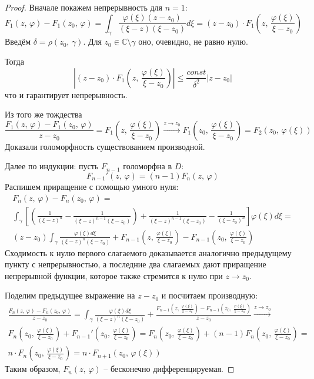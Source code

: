 \documentclass[a4paper,12pt]{article}
\renewcommand{\phi}{\ensuremath{\varphi}}
\renewcommand{\leq}{\ensuremath{\leqslant}}
\theoremstyle{plain}
\theoremstyle{definition}
\theoremstyle{remark}
\begin{document}
\begin{proof}
	Вначале покажем непрерывность для $n = 1$:
	\[
		F_1(z,\, \phi) - F_1(z_0,\, \phi) = \int_\gamma\frac{\phi(\xi)(z - z_0)}{(\xi - z)(\xi - z_0)}d\xi = (z - z_0)\cdot F_1\left(z,\, \frac{\phi(\xi)}{\xi - z_0}\right)
	\]
	Введём $\delta = \rho(z_0,\, \gamma)$. Для $z_0 \in \mathbb{C}\setminus \gamma$ оно, очевидно, не равно нулю.

	Тогда
	\[
		\left\vert (z - z_0)\cdot F_1\left(z,\, \frac{\phi(\xi)}{\xi - z_0}\right)\right\vert \leq \frac{const}{\delta^2}\vert z - z_0\vert
	\]
	что и гарантирует непрерывность.

	Из того же тождества
	\[
		\frac{F_1(z,\, \phi) - F_1(z_0,\, \phi)}{z - z_0} = F_1\left(z,\, \frac{\phi(\xi)}{\xi - z_0}\right) \overset{z \to z_0}{\to} F_1\left(z_0,\, \frac{\phi(\xi)}{\xi - z_0}\right) = F_2(z_0,\, \phi(\xi))
	\]
	Доказали голоморфность существованием производной.

	Далее по индукции: пусть $F_{n - 1}$ голоморфна в $D$:
	\[
		F_{n - 1}'(z,\, \phi) = (n - 1)F_n(z,\, \phi)
	\]
	Распишем приращение с помощью умного нуля:
	\begin{align*}
		F_n(z,\, \phi) - F_n(z_0,\, \phi) =                                                                                                                                                   \\
		\int_\gamma\left[\left(\frac{1}{(\xi - z)^n} - \frac{1}{(\xi - z)^{n - 1}(\xi - z_0)}\right) + \frac{1}{(\xi - z)^{n - 1}(\xi - z_0)} - \frac{1}{(\xi - z_0)^n}\right]\phi(\xi)d\xi = \\
		(z - z_0)\int_\gamma\frac{\phi(\xi)d\xi}{(\xi - z)^n(\xi - z_0)} + F_{n - 1}\left(z,\, \frac{\phi(\xi)}{\xi - z_0}\right) - F_{n-1}\left(z_0,\, \frac{\phi(\xi)}{\xi - z_0}\right)
	\end{align*}
	Сходимость к нулю первого слагаемого доказывается аналогично предыдущему пункту с непрерывностью, а последние два слагаемых дают приращение непрерывной функции, которое также стремится к нулю при $z \to z_0$.

	Поделим предыдущее выражение на $z - z_0$ и посчитаем производную:
	\begin{align*}
		\frac{F_n(z,\, \phi) - F_n(z_0,\, \phi)}{z - z_0} = \int_\gamma\frac{\phi(\xi)d\xi}{(\xi - z)^n(\xi - z_0)} + \frac{F_{n - 1}\left(z,\, \frac{\phi(\xi)}{\xi - z_0}\right) - F_{n-1}\left(z_0,\, \frac{\phi(\xi)}{\xi - z_0}\right)}{z - z_0} \overset{z \to z_0}{\to} \\
		F_n\left(z_0,\, \frac{\phi(\xi)}{\xi - z_0}\right) + F_{n - 1}'\left(z_0,\, \frac{\phi(\xi)}{\xi - z_0}\right) = F_n\left(z_0,\, \frac{\phi(\xi)}{\xi - z_0}\right) + (n-1)F_n\left(z_0,\, \frac{\phi(\xi)}{\xi - z_0}\right) =                                        \\
		n\cdot F_n\left(z_0,\, \frac{\phi(\xi)}{\xi - z_0}\right) = n\cdot F_{n + 1}(z_0,\, \phi(\xi))
	\end{align*}
	Таким образом, $F_n(z,\, \phi)$ -- бесконечно дифференцируемая.
\end{proof}
\end{document}
